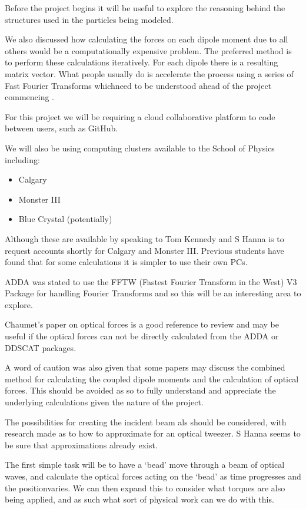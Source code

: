 \documentclass[11pt]{meetingmins}
\begin{document}
Before the project begins it will be useful to explore the reasoning behind the structures used in the particles being modeled.

We also discussed how calculating the forces on each dipole moment due to all others would be a computationally expensive problem. The preferred method is to perform these calculations iteratively. For each dipole there is a resulting matrix vector. What people usually do is accelerate the process using a series of Fast Fourier Transforms whichneed to be understood ahead of the project commencing \cite{Ref1}.

For this project we will be requiring a cloud collaborative platform to code between users, such as GitHub.

We will also be using computing clusters available to the School of Physics including:
\begin{itemize}
\item Calgary
\item Monster III
\item Blue Crystal (potentially)
\end{itemize}

Although these are available by speaking to Tom Kennedy and S Hanna is to request accounts shortly for Calgary and Monster III. Previous students have found that for some calculations it is simpler to use their own PCs.

ADDA \cite{Ref4} was stated to use the FFTW (Fastest Fourier Transform in the West) V3 Package for handling Fourier Transforms and so this will be an interesting area to explore.

Chaumet's paper on optical forces \cite{Ref5} is a good reference to review and may be useful if the optical forces can not be directly calculated from the ADDA \cite{Ref4} or DDSCAT \cite{Ref3} packages.

A word of caution was also given that some papers may discuss the combined method for calculating the coupled dipole moments and the calculation of optical forces. This should be avoided as so to fully understand and appreciate the underlying calculations given the nature of the project.

The possibilities for creating the incident beam als should be considered, with research made as to how to approximate for an optical tweezer. S Hanna seems to be sure that approximations already exist.

The first simple task will be to have a `bead' move through a beam of optical waves, and calculate the optical forces acting on the `bead' as time progresses and the positionvaries. We can then expand this to consider what torques are also being applied, and as such what sort of physical work can we do with this.
\end{document}
